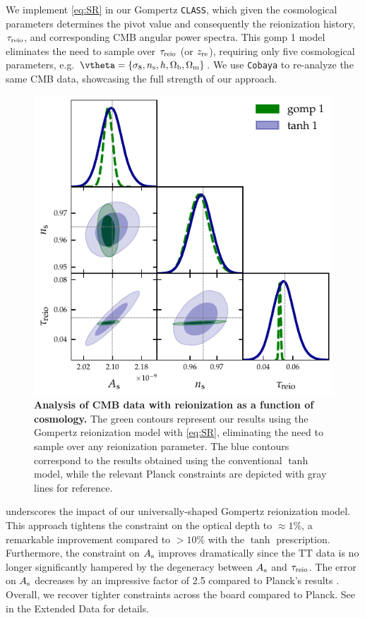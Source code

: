 We implement \cref{eq:SR} in our Gompertz \texttt{CLASS}, which given
the cosmological parameters determines the pivot value and consequently
the reionization history, $\tau_{\mathrm{reio}}$, and corresponding CMB angular
power spectra.
This gomp 1 model eliminates the need to sample over $\tau_{\mathrm{reio}}$ (or $z_{\mathrm{re}}$),
requiring only five cosmological parameters, e.g. $\vtheta = \{ \sigma_8,
\ns, h, \Omegab, \Omegam\}$.
We use \texttt{Cobaya} to re-analyze the same CMB data,
showcasing the full strength of our approach.

\begin{figure}[tb]
\centering
\includegraphics[width=0.7\linewidth]{figs/gomp_tanh_triangle_kill.pdf}
\caption{\textbf{Analysis of CMB data with reionization as a function of
cosmology.}
The green contours represent our results using the Gompertz reionization
model with \cref{eq:SR}, eliminating the need to sample over any
reionization parameter.
The blue contours correspond to the results obtained using the
conventional $\tanh$ model, while the relevant Planck constraints
\cite{Planck2020a} are depicted with gray lines for reference.}
\label{fig:kill}
\end{figure}

 underscores the impact of our universally-shaped
Gompertz reionization model. This approach tightens the constraint on the optical depth to $\approx
1\%$, a remarkable improvement compared to $> 10\%$ with the $\tanh$
prescription.
Furthermore, the constraint on $A_\mathrm{s}$ improves dramatically since the TT
data is no longer significantly hampered by the degeneracy between $A_\mathrm{s}$
and $\tau_{\mathrm{reio}}$.
The error on $A_\mathrm{s}$ decreases by an impressive factor of 2.5 compared to
Planck's results \cite{Planck2020a}.
Overall, we recover tighter constraints across the board compared to
Planck.
See  in the Extended Data for details.

